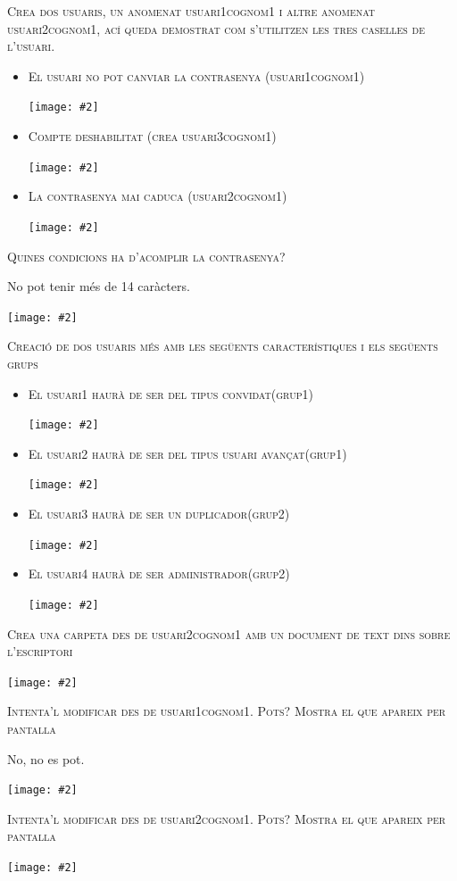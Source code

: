 \documentclass[a4paper,12pt]{article}
\newcommand{\mygraphic}[2][height=0.4\textheight]{\begin{center}
		\centering\texttt{[image: \#2]}\par
\end{center}}
\begin{document}


\newpage
\textsc{Crea dos usuaris, un anomenat usuari1cognom1 i altre anomenat usuari2cognom1, ací queda demostrat com s'utilitzen les tres caselles de l’usuari.}


\begin{itemize}
	\item \textsc{El usuari no pot canviar la contrasenya (usuari1cognom1)}
	\mygraphic{imatges/1.png}
	\newpage
	\item \textsc{Compte deshabilitat (crea usuari3cognom1)}
	\mygraphic{imatges/2.png}
	\item \textsc{La contrasenya mai caduca (usuari2cognom1)}
	\mygraphic{imatges/3.png}
\end{itemize}

\newpage
\textsc{Quines condicions ha d'acomplir la contrasenya?}

No pot tenir més de 14 caràcters.
\mygraphic{imatges/4.png}

\newpage
\textsc{Creació de dos usuaris més amb les següents característiques i els següents grups}

\begin{itemize}
	\item \textsc{El usuari1 haurà de ser del tipus convidat(grup1)}
	\mygraphic{imatges/5.png}
	\newpage
	\item \textsc{El usuari2 haurà de ser del tipus usuari avançat(grup1)}
	\mygraphic{imatges/6.png}
	\item \textsc{El usuari3 haurà de ser un duplicador(grup2)}
	\mygraphic{imatges/7.png}
	\item \textsc{El usuari4 haurà de ser administrador(grup2)}
	\mygraphic{imatges/8.png}
\end{itemize}

\textsc{Crea una carpeta des de usuari2cognom1 amb un document de text dins sobre l'escriptori}
\mygraphic{imatges/9.png}

\newpage
\textsc{Intenta'l modificar des de usuari1cognom1. Pots? Mostra el que apareix per pantalla}

No, no es pot.
\mygraphic{imatges/10.png}

\textsc{Intenta'l modificar des de usuari2cognom1. Pots? Mostra el que apareix per pantalla}
\mygraphic{imatges/11.png}
\end{document}
